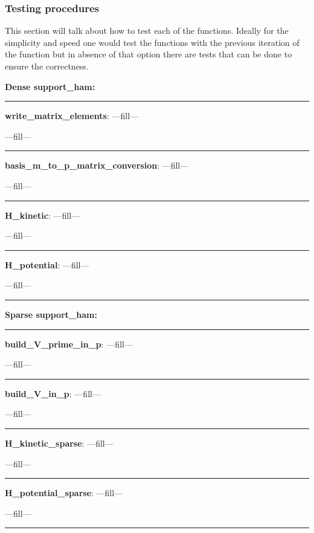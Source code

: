 \documentclass[a4paper,10pt]{article}
\begin{document}
\subsubsection{Testing procedures}

This section will talk about how to test each of the functions. Ideally for the simplicity and speed one would test the functions with the previous iteration of the function but in absence of that option there are tests that can be done to ensure the correctness.


\textbf{\newline Dense support\_ham:}

\noindent\rule{\linewidth}{0.4pt}

\textbf{write\_matrix\_elements}: ---fill---

---fill---

\noindent\rule{\linewidth}{0.4pt}

\textbf{basis\_m\_to\_p\_matrix\_conversion}: ---fill---

---fill---

\noindent\rule{\linewidth}{0.4pt}

\textbf{H\_kinetic}: ---fill---

---fill---

\noindent\rule{\linewidth}{0.4pt}

\textbf{H\_potential}: ---fill---

---fill---

\noindent\rule{\linewidth}{0.4pt}


\textbf{\newline Sparse support\_ham:}

\noindent\rule{\linewidth}{0.4pt}

\textbf{build\_V\_prime\_in\_p}: ---fill---

---fill---

\noindent\rule{\linewidth}{0.4pt}


\textbf{build\_V\_in\_p}: ---fill---

---fill---

\noindent\rule{\linewidth}{0.4pt}

\textbf{H\_kinetic\_sparse}: ---fill---

---fill---

\noindent\rule{\linewidth}{0.4pt}

\textbf{H\_potential\_sparse}: ---fill---

---fill---

\noindent\rule{\linewidth}{0.4pt}
\end{document}
